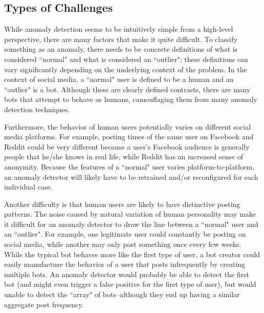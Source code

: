 \documentclass[11pt, oneside]{article}   	%
\begin{document}
\subsection{Types of Challenges}
\quad While anomaly detection seems to be intuitively simple from a high-level perspective, there are many factors that make it quite difficult.
To classify something as an anomaly, there needs to be concrete definitions of what is considered ``normal" and what is considered an ``outlier"; these definitions can vary significantly depending on the underlying context of the problem.
In the context of social media, a ``normal" user is defined to be a human and an ``outlier" is a bot.
Although these are clearly defined contrasts, there are many bots that attempt to behave as humans, camouflaging them from many anomaly detection techniques.

\quad Furthermore, the behavior of human users potentially varies on different social media platforms.
For example, posting times of the same user on Facebook and Reddit could be very different because a user's Facebook audience is generally people that he/she knows in real life, while Reddit has an increased sense of anonymity.
Because the features of a ``normal" user varies platform-to-platform, an anomaly detector will likely have to be retrained and/or reconfigured for each individual case.

\quad Another difficulty is that human users are likely to have distinctive posting patterns.
The noise caused by natural variation of human personality may make it difficult for an anomaly detector to draw the line between a ``normal" user and an ``outlier".
For example, one legitimate user could constantly be posting on social media, while another may only post something once every few weeks.
While the typical bot behaves more like the first type of user, a bot creator could easily manufacture the behavior of a user that posts infrequently by creating multiple bots.
An anomaly detector would probably be able to detect the first bot (and might even trigger a false positive for the first type of user), but would unable to detect the ``array" of bots--although they end up having a similar aggregate post frequency.
\end{document}
